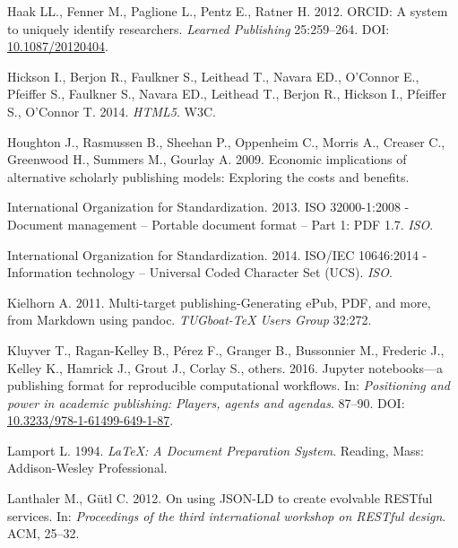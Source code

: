 \documentclass[10pt,fleqn]{wlpeerj}
\begin{document}
\hypertarget{ref-haakux5forcidux5f2012}{}
Haak LL., Fenner M., Paglione L., Pentz E., Ratner H. 2012. ORCID: A
system to uniquely identify researchers. \emph{Learned Publishing}
25:259--264. DOI:
\href{https://doi.org/10.1087/20120404}{10.1087/20120404}.

\hypertarget{ref-HTML5}{}
Hickson I., Berjon R., Faulkner S., Leithead T., Navara ED., O'Connor
E., Pfeiffer S., Faulkner S., Navara ED., Leithead T., Berjon R.,
Hickson I., Pfeiffer S., O'Connor T. 2014. \emph{HTML5}. W3C.

\hypertarget{ref-houghtonux5feconomicux5f2009}{}
Houghton J., Rasmussen B., Sheehan P., Oppenheim C., Morris A., Creaser
C., Greenwood H., Summers M., Gourlay A. 2009. Economic implications of
alternative scholarly publishing models: Exploring the costs and
benefits.

\hypertarget{ref-internationalux5forganizationux5fforux5fstandardizationux5fisoux5f2013}{}
International Organization for Standardization. 2013. ISO 32000-1:2008 -
Document management -- Portable document format -- Part 1: PDF 1.7.
\emph{ISO}.

\hypertarget{ref-internationalux5forganizationux5fforux5fstandardizationux5fisoux2fiecux5f2014}{}
International Organization for Standardization. 2014. ISO/IEC 10646:2014
- Information technology -- Universal Coded Character Set (UCS).
\emph{ISO}.

\hypertarget{ref-kielhornux5fmultiux5f2011}{}
Kielhorn A. 2011. Multi-target publishing-Generating ePub, PDF, and
more, from Markdown using pandoc. \emph{TUGboat-TeX Users Group} 32:272.

\hypertarget{ref-kluyverux5fjupyterux5f2016}{}
Kluyver T., Ragan-Kelley B., Pérez F., Granger B., Bussonnier M.,
Frederic J., Kelley K., Hamrick J., Grout J., Corlay S., others. 2016.
Jupyter notebooks---a publishing format for reproducible computational
workflows. In: \emph{Positioning and power in academic publishing:
Players, agents and agendas}. 87--90. DOI:
\href{https://doi.org/10.3233/978-1-61499-649-1-87}{10.3233/978-1-61499-649-1-87}.

\hypertarget{ref-lamportux5flatex:ux5f1994}{}
Lamport L. 1994. \emph{LaTeX: A Document Preparation System}. Reading,
Mass: Addison-Wesley Professional.

\hypertarget{ref-lanthalerux5fjsonldux5f2012}{}
Lanthaler M., Gütl C. 2012. On using JSON-LD to create evolvable RESTful
services. In: \emph{Proceedings of the third international workshop on
RESTful design}. ACM, 25--32.
\end{document}

